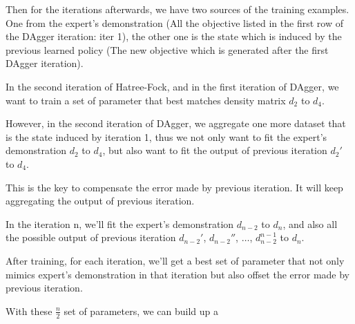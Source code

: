 \documentclass[twoside]{article}
\begin{document}
Then for the iterations afterwards, we have two sources of the training examples. 
One from the expert's demonstration (All the objective listed in the first row of the DAgger iteration: iter 1), the other one is the state which is induced by the previous learned policy (The new objective which is generated after the first DAgger iteration).

In the second iteration of Hatree-Fock, and in the first iteration of DAgger, 
we want to train a set of parameter that best matches density matrix $d_2$ to $d_4$.

However, in the second iteration of DAgger, we aggregate one more dataset that is the state induced by iteration 1,
thus we not only want to fit the expert's demonstration $d_2$ to $d_4$, but also want to fit the output of previous iteration $d_{2}'$ to $d_4$.

This is the key to compensate the error made by previous iteration.
It will keep aggregating the output of previous iteration.

In the iteration n,  we'll fit the expert's demonstration $d_{n-2}$ to $d_n$, and also all the possible output of previous iteration $d_{n-2}'$,  $d_{n-2}''$, $\ldots$,  $d_{n-2}^{n-1}$  to $d_n$.

After training, for each iteration, we'll get a best set of parameter that not only mimics expert's demonstration in that iteration but also offset the error made by previous iteration.


With these $\frac{n}{2}$ set of parameters, we can build up a 
\end{document}
